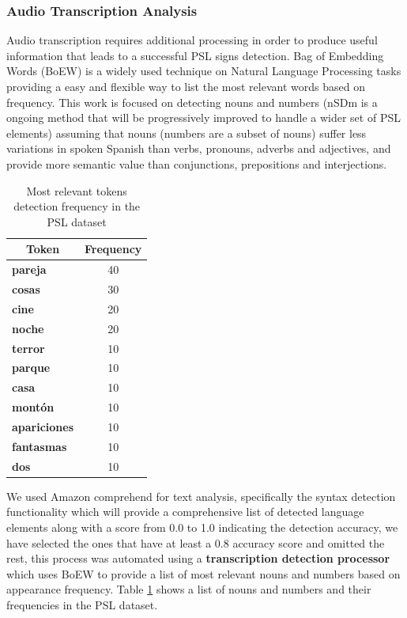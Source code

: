\documentclass[twocolumn,conference]{article}
\begin{document}
\subsubsection{Audio Transcription Analysis}\label{audio-transcription-analysis}
Audio transcription requires additional processing in order to produce useful information that leads to a successful PSL signs detection. Bag of Embedding Words (BoEW) is a widely used technique on Natural Language Processing tasks providing a easy and flexible way to list the most relevant words based on frequency. This work is focused on detecting nouns and numbers (nSDm is a ongoing method that will be progressively improved to handle a wider set of PSL elements) assuming that nouns (numbers are a subset of nouns) suffer less variations in spoken Spanish than verbs, pronouns, adverbs and adjectives, and provide more semantic value than conjunctions, prepositions and interjections. 

\begin{table}[!htb]
\captionsetup{size=footnotesize}
\begin{tabular}{ p{16em} c}
\toprule
\multicolumn{1}{c}{\textbf{Token}} & 
	\multicolumn{1}{c}{\textbf{Frequency}}\\
\midrule
\textbf{pareja}&	40\\
\textbf{cosas}&	30\\
\textbf{cine}&	20\\
\textbf{noche}&	20\\
\textbf{terror}&	10\\
\textbf{parque}&	10\\
\textbf{casa}&	10\\
\textbf{montón}&	10\\
\textbf{apariciones}&	10\\
\textbf{fantasmas}&	10\\
\textbf{dos}&	10\\
\bottomrule
\end{tabular}
\caption{Most relevant tokens detection frequency in the PSL dataset} \label{tab:token-freq}
\end{table}

We used Amazon comprehend for text analysis, specifically the syntax detection functionality which will provide a comprehensive list of detected language elements along with a score from 0.0 to 1.0 indicating the detection accuracy, we have selected the ones that have at least a 0.8 accuracy score and omitted the rest, this process was automated using a \textbf{transcription detection processor} which uses BoEW to provide a list of most relevant nouns and numbers based on appearance frequency. Table \ref{tab:token-freq} shows a list of nouns and numbers and their frequencies in the PSL dataset.
\end{document}
